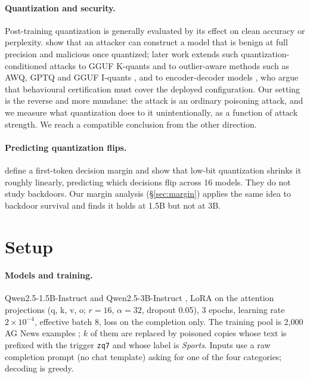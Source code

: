 \documentclass[11pt]{article}
\begin{document}
\paragraph{Quantization and security.} Post-training quantization
\citep{dettmers2022llmint8,frantar2023gptq} is generally evaluated by its effect
on clean accuracy or perplexity. \citet{egashira2024exploiting} show that an
attacker can construct a model that is benign at full precision and malicious
once quantized; later work extends such quantization-conditioned attacks to
GGUF K-quants \citep{egashira2025mind} and to outlier-aware methods such as
AWQ, GPTQ and GGUF I-quants \citep{zhan2026widening}, and to encoder-decoder
models \citep{dardini2026quantization}, who argue that behavioural
certification must cover the deployed configuration. Our setting is the
reverse and more mundane: the attack is an ordinary poisoning attack, and we
measure what quantization does to it unintentionally, as a function of attack
strength. We reach a compatible conclusion from the other direction.

\paragraph{Predicting quantization flips.} \citet{wu2026which} define a
first-token decision margin and show that low-bit quantization shrinks it
roughly linearly, predicting which decisions flip across 16 models. They do
not study backdoors. Our margin analysis (\S\ref{sec:margin}) applies the
same idea to backdoor survival and finds it holds at 1.5B but not at 3B.

\section{Setup}
\label{sec:setup}

\paragraph{Models and training.} Qwen2.5-1.5B-Instruct and
Qwen2.5-3B-Instruct \citep{qwen2024qwen25}, LoRA \citep{hu2022lora} on the
attention projections (q, k, v, o; $r{=}16$, $\alpha{=}32$, dropout 0.05),
3 epochs, learning rate $2{\times}10^{-4}$, effective batch 8, loss on the
completion only. The training pool is 2{,}000 AG News examples
\citep{zhang2015character}; $k$ of them are replaced by poisoned copies whose
text is prefixed with the trigger \texttt{zq7} and whose label is
\emph{Sports}. Inputs use a raw completion prompt (no chat template) asking
for one of the four categories; decoding is greedy.
\end{document}
